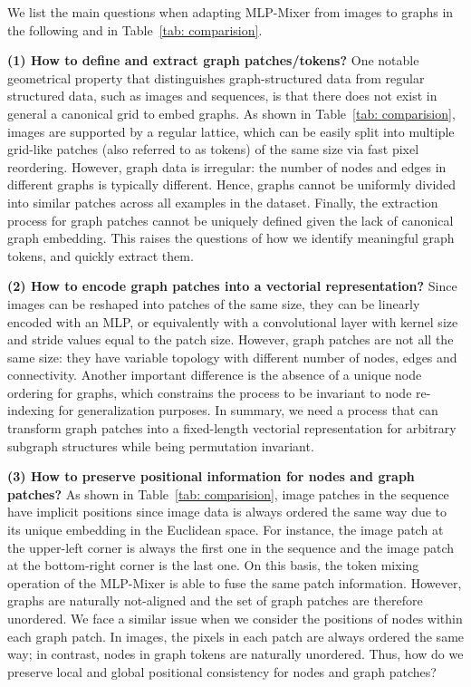 \documentclass{article}
\begin{document}
We list the main questions when adapting MLP-Mixer from images to graphs in the following and in Table~\ref{tab: comparision}. 

\textbf{(1) How to define and extract graph patches/tokens?} One notable geometrical property that distinguishes graph-structured data from regular structured data, such as images and sequences, is that there does not exist in general a canonical grid to embed graphs. As shown in Table~\ref{tab: comparision}, images are supported by a regular lattice, which can be easily split into multiple grid-like patches (also referred to as tokens) of the same size via fast pixel reordering. However, graph data is irregular: the number of nodes and edges in different graphs is typically different. Hence, graphs cannot be uniformly divided into similar patches across all examples in the dataset. Finally, the extraction process for graph patches cannot be uniquely defined given the lack of canonical graph embedding. This raises the questions of how we identify meaningful graph tokens, and quickly extract them.



\textbf{(2) How to encode graph patches into a vectorial representation?} 
 Since images can be reshaped into patches of the same  size, they can be linearly encoded with an MLP, or equivalently with a convolutional layer with kernel size and stride values equal to the patch size. However, graph patches are not all the same size: they have variable topology with different number of nodes, edges and connectivity. Another important difference is the absence of a unique node ordering for graphs, which constrains the process to be invariant to node re-indexing for generalization purposes. In summary, we need a process that can transform graph patches into a fixed-length vectorial representation for arbitrary subgraph structures while being permutation invariant.  


\textbf{(3) How to preserve positional information for nodes and graph patches?}  
As shown in Table~\ref{tab: comparision}, image patches in the sequence have implicit positions since image data is always ordered the same way due to its unique embedding in the Euclidean space. For instance, the image patch at the upper-left corner is always the first one in the sequence and the image patch at the bottom-right corner is the last one. On this basis, the token mixing operation of the MLP-Mixer is able to fuse the same patch information. However, graphs are naturally not-aligned and the set of graph patches are therefore unordered. We face a similar issue when we consider the positions of nodes within each graph patch. In images, the pixels in each patch are always ordered the same way; in contrast, nodes in graph tokens are naturally unordered. Thus, how do we preserve local and global positional consistency for nodes and graph patches?
 
\end{document}
